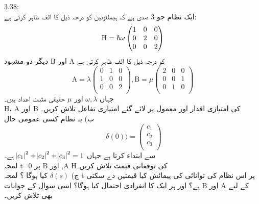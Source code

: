  3.38:\\
ایک نظام جو 3 صدی ہے کہ ہيملٹونین کو درجہ ذیل کا الف ظاہر کرتی ہے:\\
\[\text{\text{H}}=\hslash\omega\begin{pmatrix}
1&0&0\\
0&2&0\\
0&0&2\\
\end{pmatrix}\]
دیگر دو مشہود B اور A کو درجہ ذيل کا الف ظاہر کرتی ہے\\
\[\text{A}=\lambda\begin{pmatrix}
0&1&0\\
1&0&0\\
0&0&2\\
\end{pmatrix} , \text{B}=\mu\begin{pmatrix}
2&0&0\\
0&0&1\\
0&1&0\\
\end{pmatrix}
\]
جہاں
\(\omega, \lambda\)
اور
\(\mu\)
حقیقی مثبت اعداد ہیں۔\\
H، A
اور
B
 کی امتیازی اقدار اور معمول پر لائے  گئے امتیازی تفاعل تلاش کریں۔ \\
ب) یہ نظام کسی عمومی حال
\[| \delta(0)  \rangle=\begin{pmatrix}
c_{1}\\
c_{2}\\
c_{3}\\
\end{pmatrix}\]
سے ابتداء کرتا ہے جہاں
\(\abs{c_{1}}^{2}+\abs{c_{2}}^{2}+\abs{c_{3}}^{2}=1\)
ہے۔\\
لمحہ t=0 پر B اور ,A Hکی توقعاتی قیمت تلاش كريں۔\\
ج)
 \(\delta(s)\) 
کیا ہوگا ؟
لمحہ t پر اس نظام کی توانائی کی پیمائش کیا قيمتيں دے سکتی ہے؟ اور ہر ایک کا انفرادى احتمال کیا ہوگا؟ اسی سوال کے جوابات B اور A کے لیے بھی تلاش كریں۔


